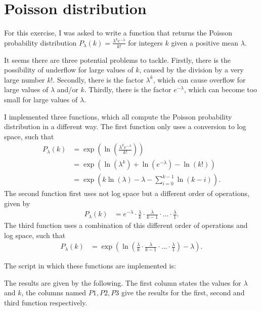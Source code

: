 \section{Poisson distribution}

For this exercise, I was asked to write a function that returns the Poisson probability distribution 
$P_\lambda(k)=\frac{\lambda^ke^{-\lambda}}{k!}$ for integers $k$ given a positive mean $\lambda$.

It seems there are three potential problems to tackle. Firstly, there is the possibility of underflow for large values of $k$,
caused by the division by a very large number $k!$. Secondly, there is the factor $\lambda^k$, which can cause overflow for large values of $\lambda$ and/or $k$.
Thirdly, there is the factor $e^{-\lambda}$, which can become too small for large values of $\lambda$.

I implemented three functions, which all compute the Poisson probability distribution in a different way.
The first function only uses a conversion to log space, such that
\begin{align*}
    P_\lambda(k)&=\exp(\ln(\frac{\lambda^ke^{-\lambda}}{k!}))\\
    &=\exp(\ln(\lambda^k)+\ln(e^{-\lambda})-\ln(k!))\\
    &=\exp(k\ln(\lambda)-\lambda-\sum_{i=0}^{k-1}\ln(k-i)).
\end{align*}
The second function first uses not log space but a different order of operations, given by
\begin{align*}
    P_\lambda(k)&=e^{-\lambda}\cdot\frac{\lambda}{k}\cdot\frac{\lambda}{k-1}\cdot\dots\cdot\frac{\lambda}{1}.
\end{align*}
The third function uses a combination of this different order of operations and log space, such that
\begin{align*}
    P_\lambda(k)&=\exp(\ln(\frac{\lambda}{k}\cdot\frac{\lambda}{k-1}\cdot\dots\cdot\frac{\lambda}{1})-\lambda).
\end{align*}

The script in which these functions are implemented is:


The results are given by the following. The first column states the values for $\lambda$ and $k$, 
the columns named $P1, P2, P3$ give the results for the first, second and third function respectively.


